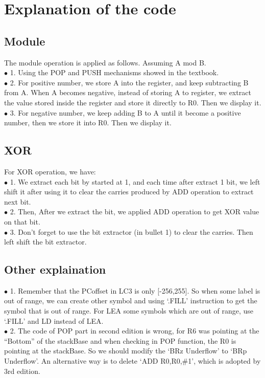 \documentclass[a4paper]{article}
\begin{document}
    \section{Explanation of the code}
    \subsection{Module}
    The module operation is applied as follows. Assuming A mod B. \\
    $\bullet$ 1. Using the POP and PUSH mechanisms showed in the textbook.\\
    $\bullet$ 2. For positive number, we store A into the register, and keep subtracting B from A.
    When A becomes negative, instead of storing A to register, we extract the value stored inside the register
    and store it directly to R0. Then we display it.\\
    $\bullet$ 3. For negative number, we keep adding B to A until it become a positive number, then we store it into
    R0. Then we display it.
    \subsection{XOR}
    For XOR operation, we have:\\
    $\bullet$ 1. We extract each bit by started at 1, and each time after extract 1 bit, we left shift it after 
    using it to clear the carries produced by ADD operation to extract next bit.\\
    $\bullet$ 2. Then, After we extract the bit, we applied ADD operation to get XOR value on that bit.\\
    $\bullet$ 3. Don't forget to use the bit extractor (in bullet 1) to clear the carries. Then left shift the bit extractor.
    \subsection{Other explaination}
    \noindent
    $\bullet$ 1. Remember that the PCoffset in LC3 is only [-256,255]. So when some label is out of range,
    we can create other symbol and using `.FILL' instruction to get the symbol that is out of range. For LEA 
    some symbols which are out of range, use `.FILL' and LD instead of LEA.\\
    $\bullet$ 2. The code of POP part in second edition is wrong, for R6 was pointing at the ``Bottom'' of the stackBase and 
    when checking in POP function, the R0 is pointing at the stackBase. So we should modify the `BRz Underflow' to `BRp Underflow'.
    An alternative way is to delete `ADD R0,R0,\#1', which is adopted by 3rd edition.\\
\end{document}
